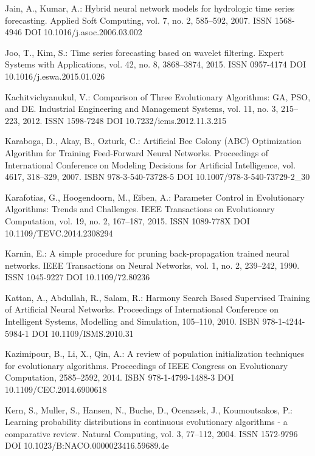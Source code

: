 \begin{thebibliography}{99.}
 Jain, A., Kumar, A.: Hybrid neural network models for hydrologic time series forecasting. Applied Soft Computing, vol. 7, no. 2, 585--592, 2007. ISSN 1568-4946 DOI 10.1016/j.asoc.2006.03.002

 Joo, T., Kim, S.: Time series forecasting based on wavelet filtering. Expert Systems with Applications, vol. 42, no. 8, 3868--3874, 2015. ISSN 0957-4174 DOI 10.1016/j.eswa.2015.01.026

 Kachitvichyanukul, V.: Comparison of Three Evolutionary Algorithms: GA, PSO, and DE. Industrial Engineering and Management Systems, vol. 11, no. 3, 215--223, 2012. ISSN 1598-7248 DOI 10.7232/iems.2012.11.3.215

 Karaboga, D., Akay, B., Ozturk, C.: Artificial Bee Colony (ABC) Optimization Algorithm for Training Feed-Forward Neural Networks. Proceedings of International Conference on Modeling Decisions for Artificial Intelligence, vol. 4617, 318--329, 2007. ISBN 978-3-540-73728-5 DOI 10.1007/978-3-540-73729-2\_30

 Karafotias, G., Hoogendoorn, M., Eiben, A.: Parameter Control in Evolutionary Algorithms: Trends and Challenges. IEEE Transactions on Evolutionary Computation, vol. 19, no. 2, 167--187, 2015. ISSN 1089-778X DOI 10.1109/TEVC.2014.2308294

 Karnin, E.: A simple procedure for pruning back-propagation trained neural networks. IEEE Transactions on Neural Networks, vol. 1, no. 2, 239--242, 1990. ISSN 1045-9227 DOI 10.1109/72.80236

 Kattan, A., Abdullah, R., Salam, R.: Harmony Search Based Supervised Training of Artificial Neural Networks. Proceedings of International Conference on Intelligent Systems, Modelling and Simulation, 105--110, 2010. ISBN 978-1-4244-5984-1 DOI 10.1109/ISMS.2010.31

 Kazimipour, B., Li, X., Qin, A.: A review of population initialization techniques for evolutionary algorithms. Proceedings of IEEE Congress on Evolutionary Computation, 2585--2592, 2014. ISBN 978-1-4799-1488-3 DOI 10.1109/CEC.2014.6900618

 Kern, S., Muller, S., Hansen, N., Buche, D., Ocenasek, J., Koumoutsakos, P.: Learning probability distributions in continuous evolutionary algorithms - a comparative review. Natural Computing, vol. 3, 77--112, 2004. ISSN 1572-9796 DOI 10.1023/B:NACO.0000023416.59689.4e


\end{thebibliography}

